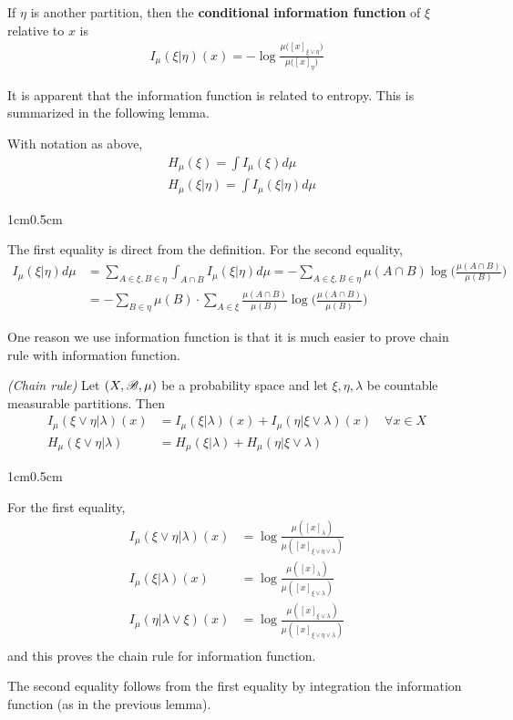 \documentclass[12pt,a4paper]{report}
\newenvironment{proof}
{\begin{changemargin}{1cm}{0.5cm} 
	}%
	{\end{changemargin}
}
\begin{document}
\quad If $\eta$ is another partition, then the \textbf{conditional information function} of $\xi$ relative to $x$ is
\begin{align*}
I_{\mu} (\xi | \eta) (x)  = - \log \frac{\mu \big( [x]_{\xi \vee \eta} \big)}{\mu \big( [x]_{\eta} \big)}
\end{align*}
\s

It is apparent that the information function is related to entropy. This is summarized in the following lemma.
\s

\lem With notation as above,
\begin{align*}
& H_{\mu}(\xi) = \int I_{\mu} (\xi) d \mu \\
& H_{\mu}(\xi | \eta) = \int I_{\mu} (\xi | \eta) d \mu
\end{align*}
\begin{proof}
\pf The first equality is direct from the definition. For the second equality,
\begin{align*}
I_{\mu} (\xi |\eta) d\mu &= \sum_{A\in \xi, B \in \eta} \int_{A \cap B} I_{\mu}(\xi | \eta) d\mu = - \sum_{A \in \xi, B\in \eta} \mu(A\cap B) \log \Big( \frac{\mu(A \cap B)}{\mu(B)}\Big) \\
&= -\sum_{B\in \eta} \mu(B) \cdot \sum_{A\in \xi} \frac{\mu(A\cap B)}{\mu(B)} \log \Big( \frac{\mu(A\cap B)}{\mu(B)} \Big)
\end{align*}

\eop
\end{proof}
\s

One reason we use information function is that it is much easier to prove chain rule with information function.
\s

\lem \emph{(Chain rule)} Let $(X,\mathscr{B}, \mu)$ be a probability space and let $\xi, \eta, \lambda$ be countable measurable partitions. Then
\begin{align*}
I_{\mu} (\xi \vee \eta | \lambda)(x) &= I_{\mu}(\xi | \lambda) (x) + I_{\mu}(\eta | \xi \vee \lambda)(x) \quad \forall x \in X \\
H_{\mu} (\xi \vee \eta | \lambda) &= H_{\mu}(\xi | \lambda)  + H_{\mu}(\eta | \xi \vee \lambda)
\end{align*}
\begin{proof}
\pf For the first equality,
\begin{align*}
I_{\mu} (\xi \vee \eta |\lambda) (x)  &= \log \frac{\mu ([x]_{\lambda})}{\mu([x]_{\xi \vee \eta \vee \lambda})} \\
I_{\mu} (\xi |\lambda) (x)  &= \log \frac{\mu ([x]_{\lambda})}{\mu([x]_{\xi \vee \lambda})} \\
I_{\mu} (\eta |\lambda \vee \xi) (x)  &= \log \frac{\mu ([x]_{\xi \vee \lambda})}{\mu([x]_{\xi \vee \eta \vee \lambda})} \\
\end{align*}
and this proves the chain rule for information function.

\quad The second equality follows from the first equality by integration the information function (as in the previous lemma).

\eop
\end{proof}
\s
\end{document}
